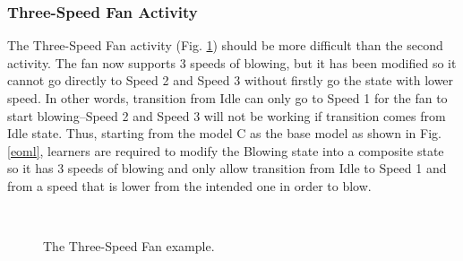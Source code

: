 \documentclass[conference]{IEEEtran}
\begin{document}
\subsubsection{Three-Speed Fan Activity}
The Three-Speed Fan activity (Fig. \ref{example-03}) should be more difficult than the second activity. The fan now supports 3 speeds of blowing, but it has been modified so it cannot go directly to Speed 2 and Speed 3 without firstly go the state with lower speed. In other words, transition from Idle can only go to Speed 1 for the fan to start blowing--Speed 2 and Speed 3 will not be working if transition comes from Idle state. Thus, starting from the model C as the base model as shown in Fig. \ref{eoml}, learners are required to modify the Blowing state into a composite state so it has 3 speeds of blowing and only allow transition from Idle to Speed 1 and from a speed that is lower from the intended one in order to blow.

\begin{figure}[th]
    \centering
    \\
	\caption{The Three-Speed Fan example.}
    \label{example-03}
\end{figure}
\end{document}
